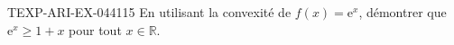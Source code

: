 \begin{exercice}{TEXP-ARI-EX-044}{1}{15}
En utilisant la convexité de $f(x) = \mathrm{e}^x$, démontrer que $\mathrm{e}^x \geq 1 + x$ pour tout $x \in \mathbb{R}$.

\end{exercice}
